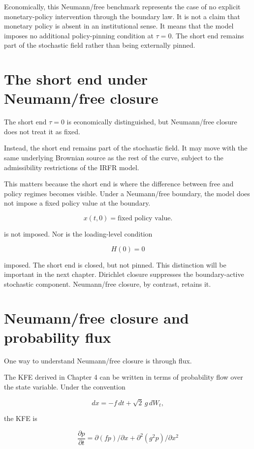 \documentclass[11pt,oneside]{book}
\begin{document}
Economically, this Neumann/free benchmark represents the case of no explicit
monetary-policy intervention through the boundary law. It is not a claim
that monetary policy is absent in an institutional sense. It means that
the model imposes no additional policy-pinning condition at $\tau=0$. The
short end remains part of the stochastic field rather than being
externally pinned.

\section{The short end under Neumann/free
closure}\label{the-short-end-under-natural-closure}

The short end $\tau=0$ is economically distinguished, but Neumann/free closure
does not treat it as fixed.

Instead, the short end remains part of the stochastic field. It may move
with the same underlying Brownian source as the rest of the curve,
subject to the admissibility restrictions of the IRFR model.

This matters because the short end is where the difference between free
and policy regimes becomes visible. Under a Neumann/free boundary, the model
does not impose a fixed policy value at the boundary.

\[
x(t,0)=\text{fixed policy value}.
\]

is not imposed. Nor is the loading-level condition

\[
H(0) = 0
\]

imposed. The short end is closed, but not pinned. This distinction will
be important in the next chapter. Dirichlet closure suppresses the
boundary-active stochastic component. Neumann/free closure, by contrast,
retains it.

\section{Neumann/free closure and probability
flux}\label{natural-closure-and-probability-flux}

One way to understand Neumann/free closure is through flux.

The KFE derived in Chapter 4 can be written in terms of probability flow
over the state variable. Under the convention

\[
dx=-f\,dt+\sqrt{2}\,g\,dW_t,
\]

the KFE is

\[
\frac{\partial p}{\partial t} = \partial(fp)/\partial x + \partial^2(g^2p)/\partial x^2
\]
\end{document}
